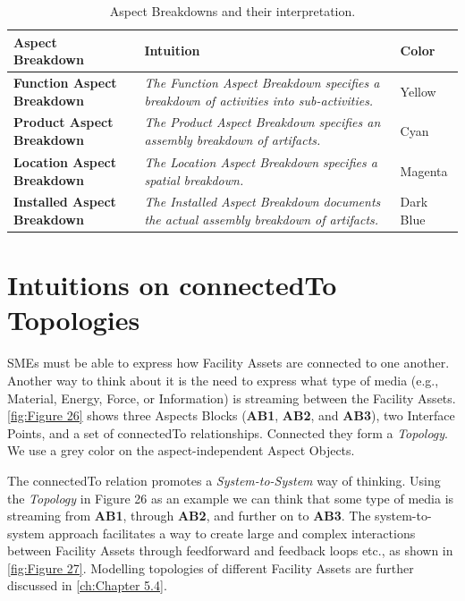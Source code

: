 \begin{table}[htb]\centering\caption{Aspect Breakdowns and their interpretation.}\label{tab:Table 14}
  \begin{supertabular}{|m{1.2962599in}|m{4.06286in}|m{0.8073598in}|}
    \hline
    {\bfseries Aspect Breakdown} &
    \textbf{Intuition} &
    {\bfseries Color}\\\hline
    {\bfseries Function Aspect Breakdown} &
    \textit{The Function Aspect Breakdown specifies a breakdown of activities into sub-activities.} &
    Yellow\\\hline
    {\bfseries Product Aspect Breakdown} &
    {\itshape The Product Aspect Breakdown specifies an assembly breakdown of artifacts.} &
    Cyan\\\hline
    {\bfseries Location Aspect Breakdown} &
    {\itshape The Location Aspect Breakdown specifies a spatial breakdown.} &
    Magenta\\\hline
    {\bfseries Installed Aspect Breakdown} &
    {\itshape The Installed Aspect Breakdown documents the actual assembly breakdown of artifacts. }
    &
    { Dark Blue}\\\hline
  \end{supertabular}
\end{table}

\section{Intuitions on connectedTo Topologies}
\label{ch:Section 4.5}
SMEs must be able to express how Facility Assets are connected to
one another. Another way to think about it is the need to express what type of media (e.g., Material, Energy, Force,
or Information) is streaming between the Facility Assets. \autoref{fig:Figure 26} shows three Aspects Blocks (\textbf{AB1},
\textbf{AB2}, and \textbf{AB3}), two Interface Points, and a set of connectedTo relationships. Connected they form a
\emph{Topology}. We use a grey color on the aspect-independent Aspect Objects.

The connectedTo relation promotes a \emph{System-to-System} way of thinking. Using the \emph{Topology} in Figure
26 as an example we can think that some type of media is streaming from \textbf{AB1}, through \textbf{AB2}, and
further on to \textbf{AB3}. The system-to-system approach facilitates a way to create large and complex interactions
between Facility Assets through feedforward and feedback loops etc., as shown in \autoref{fig:Figure 27}. Modelling topologies of
different Facility Assets are further discussed in \autoref{ch:Chapter 5.4}.

